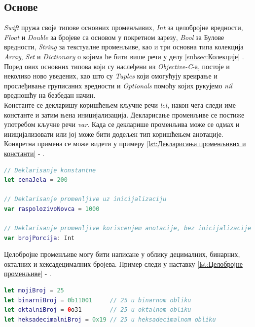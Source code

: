 \documentclass[12pt,oneside]{memoir}
\begin{document}
\subsection{Основе}

\indent \textit{Swift} пружа своје типове основних променљивих, \textit{Int} за целобројне вредности, \textit{Float} и \textit{Double} за бројеве са основом у покретном зарезу, \textit{Bool} за Булове вредности, \textit{String} за текстуалне променљиве, као и три основна типа колекција \textit{Array}, \textit{Set} и \textit{Dictionary} о којима ће бити више речи у делу \ref{subsec:Колекције} . 
\\ 
\indent Поред ових основних типова који су наслеђени из \textit{Objective-C}-а, постоје и неколико ново уведених, као што су \textit{Tuples} који омогућују креирање и прослеђивање груписаних вредности и \textit{Optionals} помоћу којих рукујемо \textit{nil} вредношћу на безбедан начин.
\\
\indent Константе се декларишу коришћењем кључне речи \textit{let}, након чега следи име константе и затим њена иницијализација. Декларисање променљиве се постиже употребом кључне речи \textit{var}. Када се декларише променљива може се одмах и иницијализовати или јој може бити додељен тип коришћењем анотације. Конкретна примена се може видети у примеру \ref{lst:Декларисања променљивих и константи} - .

\begin{lstlisting}[caption=\textit{{Декларисања променљивих и константи}}, label={lst:Декларисања променљивих и константи}, language=Swift, frame=single]
// Deklarisanje konstantne
let cenaJela = 200

// Deklarisanje promenljive uz inicijalizaciju
var raspolozivoNovca = 1000

// Deklarisanje promenljive koriscenjem anotacije, bez inicijalizacije
var brojPorcija: Int
\end{lstlisting}

\indent Целобројне променљиве могу бити написане у облику децималних, бинарних, окталних и хексадецималних бројева. Пример следи у наставку \ref{lst:Целобројне променљиве} - .

\begin{lstlisting}[caption=\textit{{Целобројне променљиве}}, label={lst:Целобројне променљиве}, language=Swift, frame=single]
let mojiBroj = 25 
let binarniBroj = 0b11001     // 25 u binarnom obliku
let oktalniBroj = 0o31        // 25 u oktalnom obliku
let heksadecimalniBroj = 0x19 // 25 u heksadecimalnom obliku
\end{lstlisting}
\end{document}
